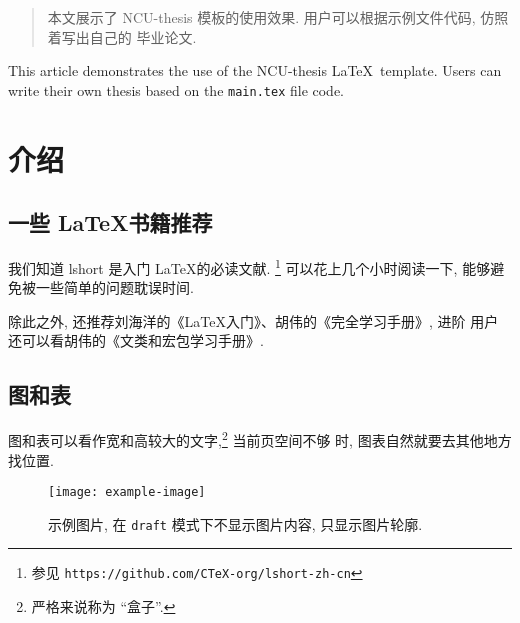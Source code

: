 \documentclass[newenv,newcmd]{ncuthesis}
\begin{document}
\maketitle
\frontmatter
\makedecaut
\begin{abstract}
本文展示了 NCU-thesis 模板的使用效果. 用户可以根据示例文件代码, 仿照着写出自己的
毕业论文. 
\end{abstract}
\begin{abstract*}
This article demonstrates the use of the NCU-thesis \LaTeX\ template.
Users can write their own thesis based on the \verb|main.tex| file code.
\end{abstract*}
\tableofcontents
\mainmatter
\chapter{介绍}
\section{一些 \LaTeX 书籍推荐}
我们知道 lshort\cite{lshortcn} 是入门 \LaTeX 的必读文献.%
\footnote{参见 \texttt{https://github.com/CTeX-org/lshort-zh-cn}}
可以花上几个小时阅读一下, 能够避免被一些简单的问题耽误时间. 

除此之外, 还推荐刘海洋的《\LaTeX 入门》、胡伟的《\LaTeXe 完全学习手册》, 进阶
用户还可以看胡伟的《\LaTeXe 文类和宏包学习手册》.
\section{图和表}
图和表可以看作宽和高较大的文字,\footnote{严格来说称为 ``盒子''.} 当前页空间不够
时, 图表自然就要去其他地方找位置.

\begin{figure}[htb]
\centering
\texttt{[image: example-image]}
\caption{示例图片, 在 \texttt{draft} 模式下不显示图片内容, 只显示图片轮廓.}
\label{fig:example-fig}
\end{figure}
\end{document}
